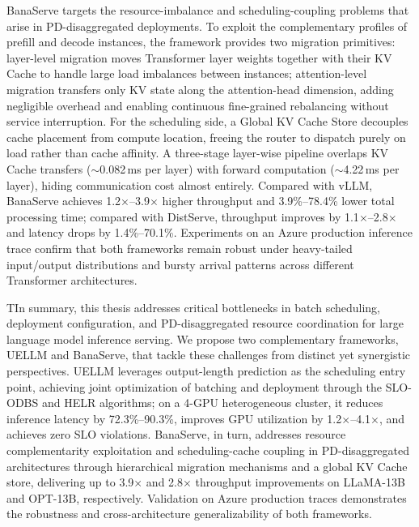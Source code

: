 \begin{abstract*}
  BanaServe targets the resource-imbalance and scheduling-coupling problems
  that arise in PD-disaggregated deployments. To exploit the complementary
  profiles of prefill and decode instances, the framework provides two
  migration primitives: layer-level migration moves Transformer layer weights
  together with their KV Cache to handle large load imbalances between
  instances; attention-level migration transfers only KV state along the
  attention-head dimension, adding negligible overhead and enabling
  continuous fine-grained rebalancing without service interruption. For the
  scheduling side, a Global KV Cache Store decouples cache placement from
  compute location, freeing the router to dispatch purely on load rather than
  cache affinity. A three-stage layer-wise pipeline overlaps KV Cache
  transfers ($\sim$0.082\,ms per layer) with forward computation
  ($\sim$4.22\,ms per layer), hiding communication cost almost entirely.
  Compared with vLLM, BanaServe achieves 1.2$\times$--3.9$\times$ higher
  throughput and 3.9\%--78.4\% lower total processing time; compared with
  DistServe, throughput improves by 1.1$\times$--2.8$\times$ and latency
  drops by 1.4\%--70.1\%. Experiments on an Azure production inference trace
  confirm that both frameworks remain robust under heavy-tailed input/output
  distributions and bursty arrival patterns across different Transformer
  architectures.


  TIn summary, this thesis addresses critical bottlenecks in batch scheduling, deployment configuration, and PD-disaggregated resource coordination for large language model inference serving.
  We propose two complementary frameworks, UELLM and BanaServe, that tackle these challenges from distinct yet synergistic perspectives.
  UELLM leverages output-length prediction as the scheduling entry point, achieving joint optimization of batching and deployment through the SLO-ODBS and HELR algorithms; on a 4-GPU heterogeneous cluster, it reduces inference latency by 72.3\%--90.3\%, improves GPU utilization by 1.2$\times$--4.1$\times$, and achieves zero SLO violations.
  BanaServe, in turn, addresses resource complementarity exploitation and scheduling-cache coupling in PD-disaggregated architectures through hierarchical migration mechanisms and a global KV Cache store, delivering up to 3.9$\times$ and 2.8$\times$ throughput improvements on LLaMA-13B and OPT-13B, respectively.
  Validation on Azure production traces demonstrates the robustness and cross-architecture generalizability of both frameworks.

\end{abstract*}
